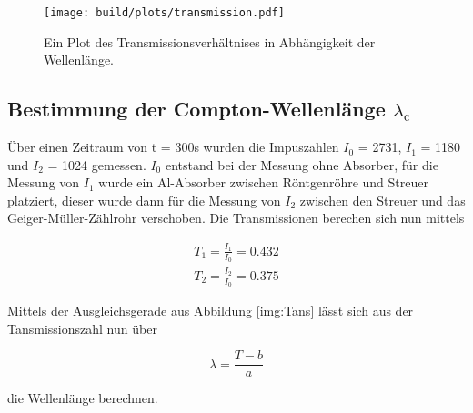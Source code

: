             \begin{figure}
                \centering
                \texttt{[image: build/plots/transmission.pdf]}
                \caption{Ein Plot des Transmissionsverhältnises in Abhängigkeit der Wellenlänge.}
                \label{img:Trans}
            \end{figure}

    \subsection{Bestimmung der Compton-Wellenlänge \texorpdfstring{$\lambda_{\text{c}}$}{TEXT}}

        \noindent Über einen Zeitraum von t = 300s wurden die Impuszahlen $I_0$ = 2731, $I_1$ = 1180 und $I_2$ = 1024 gemessen.
        $I_0$ entstand bei der Messung ohne Absorber, für die Messung von $I_1$ wurde ein Al-Absorber zwischen Röntgenröhre und 
        Streuer platziert, dieser wurde dann für die Messung von $I_2$ zwischen den Streuer und das Geiger-Müller-Zählrohr verschoben.
        Die Transmissionen berechen sich nun mittels

            \begin{align}
                T_1 = \frac{I_1}{I_0} = 0.432   \nonumber\\
                T_2 = \frac{I_2}{I_0} = 0.375   \nonumber
            \end{align}

        \noindent Mittels der Ausgleichsgerade aus Abbildung \ref{img:Tans} lässt sich aus der Tansmissionszahl nun über 
            
            \begin{equation*}
                \lambda = \frac{T - b}{a}
            \end{equation*}

        \noindent die Wellenlänge berechnen. 
            

    


    